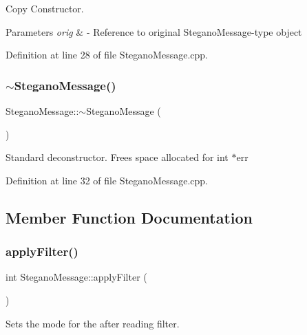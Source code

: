 Copy Constructor. 


\begin{DoxyParams}{Parameters}
{\em orig} & -\/ Reference to original Stegano\+Message-\/type object \\
\hline
\end{DoxyParams}


Definition at line 28 of file Stegano\+Message.\+cpp.

\mbox{\label{classSteganoMessage_af60430fa53ebe9ee44e60d906b67059d}} 
\subsubsection{\texorpdfstring{$\sim$SteganoMessage()}{~SteganoMessage()}}
{\footnotesize\ttfamily Stegano\+Message\+::$\sim$\+Stegano\+Message (\begin{DoxyParamCaption}{ }\end{DoxyParamCaption})\hspace{0.3cm}{\ttfamily [virtual]}}

Standard deconstructor. Frees space allocated for int $\ast$err 

Definition at line 32 of file Stegano\+Message.\+cpp.



\subsection{Member Function Documentation}
\mbox{\label{classSteganoMessage_aec575d6949cf2eb49adefe2f1299d075}} 
\subsubsection{\texorpdfstring{applyFilter()}{applyFilter()}}
{\footnotesize\ttfamily int Stegano\+Message\+::apply\+Filter (\begin{DoxyParamCaption}{ }\end{DoxyParamCaption})}



Sets the mode for the after reading filter. 

